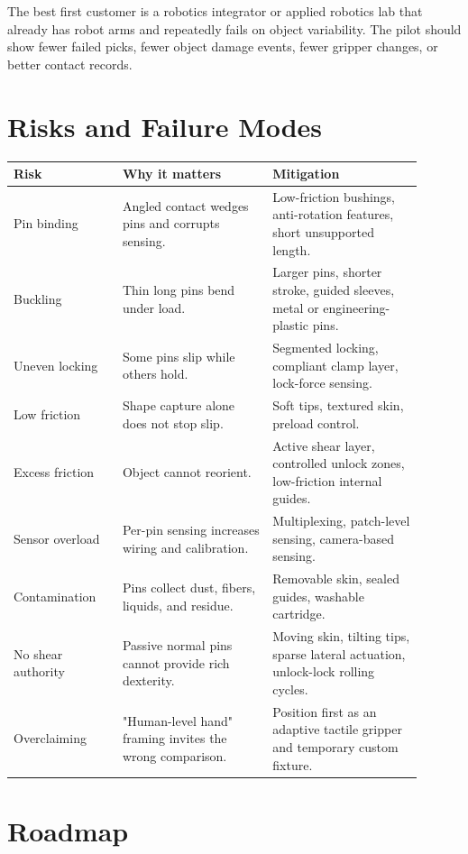 \documentclass[11pt]{article}
\begin{document}
The best first customer is a robotics integrator or applied robotics lab that already has robot arms and repeatedly fails on object variability. The pilot should show fewer failed picks, fewer object damage events, fewer gripper changes, or better contact records.

\section{Risks and Failure Modes}

\begin{longtable}{L{0.24\linewidth} L{0.33\linewidth} L{0.33\linewidth}}
\toprule
\textbf{Risk} & \textbf{Why it matters} & \textbf{Mitigation} \\
\midrule
\endhead
Pin binding & Angled contact wedges pins and corrupts sensing. & Low-friction bushings, anti-rotation features, short unsupported length. \\
Buckling & Thin long pins bend under load. & Larger pins, shorter stroke, guided sleeves, metal or engineering-plastic pins. \\
Uneven locking & Some pins slip while others hold. & Segmented locking, compliant clamp layer, lock-force sensing. \\
Low friction & Shape capture alone does not stop slip. & Soft tips, textured skin, preload control. \\
Excess friction & Object cannot reorient. & Active shear layer, controlled unlock zones, low-friction internal guides. \\
Sensor overload & Per-pin sensing increases wiring and calibration. & Multiplexing, patch-level sensing, camera-based sensing. \\
Contamination & Pins collect dust, fibers, liquids, and residue. & Removable skin, sealed guides, washable cartridge. \\
No shear authority & Passive normal pins cannot provide rich dexterity. & Moving skin, tilting tips, sparse lateral actuation, unlock-lock rolling cycles. \\
Overclaiming & "Human-level hand" framing invites the wrong comparison. & Position first as an adaptive tactile gripper and temporary custom fixture. \\
\bottomrule
\end{longtable}

\section{Roadmap}
\end{document}
